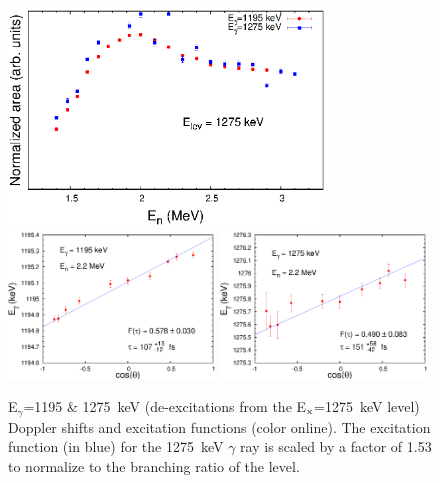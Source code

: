 \begin{figure}[h]
\begin{center}
\includegraphics[width=0.75\textwidth]{figures/1195_ExF.eps}\\
\includegraphics[width=0.49\textwidth]{figures/1195_DSAM.eps}
\includegraphics[width=0.49\textwidth]{figures/1275_DSAM.eps}

\caption{E$_\gamma$=1195 \& 1275~keV (de-excitations from the E$_{\rm x}$=1275~keV level) Doppler shifts and excitation functions (color online). The excitation function (in blue) for the 1275~keV $\gamma$ ray is scaled by a factor of 1.53 to normalize to the branching ratio of the level. \label{fig:1275_DSAM_EXF}}
\end{center}
\end{figure}

